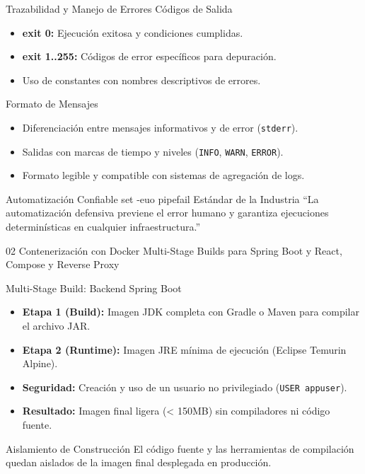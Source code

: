\documentclass[aspectratio=169]{beamer}
\begin{document}
\contentSlideTwoCols
  {Trazabilidad y Manejo de Errores}
  {Códigos de Salida}
  {
    \begin{itemize}
      \item \textbf{exit 0:} Ejecución exitosa y condiciones cumplidas.
      \item \textbf{exit 1..255:} Códigos de error específicos para depuración.
      \item Uso de constantes con nombres descriptivos de errores.
    \end{itemize}
  }
  {Formato de Mensajes}
  {
    \begin{itemize}
      \item Diferenciación entre mensajes informativos y de error (\texttt{stderr}).
      \item Salidas con marcas de tiempo y niveles (\texttt{INFO}, \texttt{WARN}, \texttt{ERROR}).
      \item Formato legible y compatible con sistemas de agregación de logs.
    \end{itemize}
  }

\contentSlideQuoteStat
  {Automatización Confiable}
  {set -euo pipefail}
  {Estándar de la Industria}
  {“La automatización defensiva previene el error humano y garantiza ejecuciones determinísticas en cualquier infraestructura.”}

\sectionSlideSolid
  {02}
  {Contenerización con Docker}
  {Multi-Stage Builds para Spring Boot y React, Compose y Reverse Proxy}

\contentSlideBulletCard
  {Multi-Stage Build: Backend Spring Boot}
  {
    \begin{itemize}
      \item \textbf{Etapa 1 (Build):} Imagen JDK completa con Gradle o Maven para compilar el archivo JAR.
      \item \textbf{Etapa 2 (Runtime):} Imagen JRE mínima de ejecución (Eclipse Temurin Alpine).
      \item \textbf{Seguridad:} Creación y uso de un usuario no privilegiado (\texttt{USER appuser}).
      \item \textbf{Resultado:} Imagen final ligera (< 150MB) sin compiladores ni código fuente.
    \end{itemize}
  }
  {Aislamiento de Construcción}
  {El código fuente y las herramientas de compilación quedan aislados de la imagen final desplegada en producción.}
\end{document}

